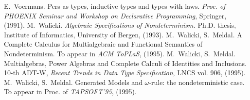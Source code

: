 \begin{thebibliography}{BGW80}
 E.~Voermans. Pers as types, inductive types and types with
laws. {\em Proc. of PHOENIX Seminar and Workshop on Declarative Programming}, Springer, (1991).
 M.~Walicki.
{\em Algebraic Specifications of Nondeterminism.} Ph.D. thesis, Institute of Informatics, University of Bergen, (1993). 
 M.~Walicki, S.~Meldal. A Complete Calculus for 
Multialgebraic and Functional Semantics of Nondeterminism. 
To appear in {\em ACM ToPLaS}, (1995).
 M.~Walicki, S.~Meldal. Multialgebras, Power Algebras 
and Complete Calculi of Identities and Inclusions. 10-th ADT-W, 
{\em Recent Trends in Data Type Specification}, LNCS vol. 906, (1995).
 M.~Walicki, S.~Meldal. Generated Models and $\omega$-rule:
the nondeterministic case. To appear in Proc. of {\em TAPSOFT'95}, (1995).
 \end{thebibliography}


